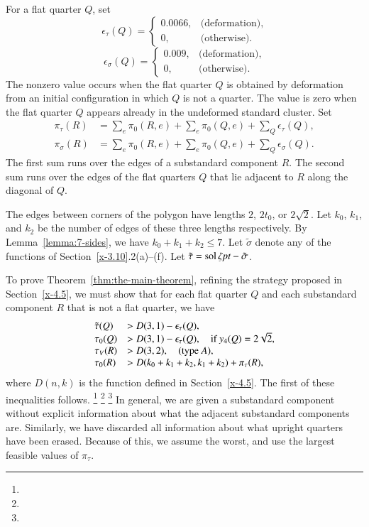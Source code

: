 For a flat quarter $Q$, set
    $$
    \epsilon_\tau(Q) =
        \begin{cases} 0.0066,&\text{(deformation),}\\
            0,&\text{(otherwise)}.
        \end{cases}
    $$
    $$
    \epsilon_\sigma(Q) =
        \begin{cases}
         0.009,&\text{(deformation),}\\
            0,&\text{(otherwise)}.
        \end{cases}
    $$
The nonzero value occurs when the flat quarter $Q$ is obtained by
deformation from an initial configuration in which $Q$ is not a quarter.
The value is zero when the flat quarter $Q$ appears already in the
undeformed standard cluster. Set
    $$
    \begin{array}{lll}
    \pi_\tau(R) &= \sum_e \pi_0(R,e) +
    \sum_e\pi_0(Q,e)+\sum_Q \epsilon_\tau(Q),\\
    \pi_\sigma(R)&=\sum_e \pi_0(R,e) +
    \sum_e\pi_0(Q,e)+\sum_Q \epsilon_\sigma(Q).
    \end{array}
    $$
The first sum runs over the edges of a substandard component $R$.  The second sum
runs over the edges of the flat quarters $Q$ that lie adjacent to $R$
along the diagonal of $Q$.

The edges between corners of the polygon have lengths $2$, $2t_0$, or
$2\sqrt{2}$.  Let $k_0$, $k_1$, and $k_2$ be the number of edges of
these three lengths respectively.  By Lemma~\ref{lemma:7-sides}, we have
$k_0+k_1+k_2\le7$. Let $\tilde\sigma$ denote any of the functions of
Section~\ref{x-3.10}.2(a)--(f). Let $\tilde\tau = \operatorname{sol}\zeta\hbox{\it pt} -
\tilde\sigma$.

To prove Theorem~\ref{thm:the-main-theorem}, refining the strategy
proposed in Section~\ref{x-4.5}, we must show that for each flat quarter
$Q$ and each substandard component $R$ that is not a flat quarter, we have
    \begin{equation}
    \begin{array}{lll}
    \tilde\tau(Q) &> D(3,1) - \epsilon_\tau(Q),\\
    \tau_0(Q) &> D(3,1)-\epsilon_\tau(Q),\quad\text{if }y_4(Q)=2\sqrt2,\\
    \tau_V(R) &> D(3,2),\quad\text{(type $A$)},\\
    \tau_0(R) &> D(k_0+k_1+k_2,k_1+k_2)+\pi_\tau(R),
    \label{eqn:tau>D(n,k)}
    \end{array}
    \end{equation}
where $D(n,k)$ is the function defined in Section~\ref{x-4.5}. The first
of these inequalities follows.%
\footnote{} %
\footnote{} %
\footnote{} %
In general,
we are given a substandard component without explicit information about what the
adjacent substandard components are.  Similarly, we have discarded all information
about what upright quarters have been erased.  Because of this, we
assume the worst, and use the largest feasible values of $\pi_\tau$.


